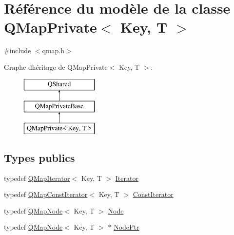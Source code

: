 \hypertarget{class_q_map_private}{}\section{Référence du modèle de la classe Q\+Map\+Private$<$ Key, T $>$}
\label{class_q_map_private}


{\ttfamily \#include $<$qmap.\+h$>$}

Graphe d\textquotesingle{}héritage de Q\+Map\+Private$<$ Key, T $>$\+:\begin{figure}[H]
\begin{center}
\leavevmode
\includegraphics[height=3.000000cm]{class_q_map_private}
\end{center}
\end{figure}
\subsection*{Types publics}
\begin{DoxyCompactItemize}
\item 
typedef \hyperlink{class_q_map_iterator}{Q\+Map\+Iterator}$<$ Key, T $>$ \hyperlink{class_q_map_private_a5326545ba578532909650c2f4a8d4d34}{Iterator}
\item 
typedef \hyperlink{class_q_map_const_iterator}{Q\+Map\+Const\+Iterator}$<$ Key, T $>$ \hyperlink{class_q_map_private_a579a86f244015186e41bfa3cf85a5054}{Const\+Iterator}
\item 
typedef \hyperlink{struct_q_map_node}{Q\+Map\+Node}$<$ Key, T $>$ \hyperlink{class_q_map_private_a14bbee368a168ea06680b51eef901c27}{Node}
\item 
typedef \hyperlink{struct_q_map_node}{Q\+Map\+Node}$<$ Key, T $>$ $\ast$ \hyperlink{class_q_map_private_a6b529a90a461f2d2df3e1b2356250fb4}{Node\+Ptr}
\end{DoxyCompactItemize}
